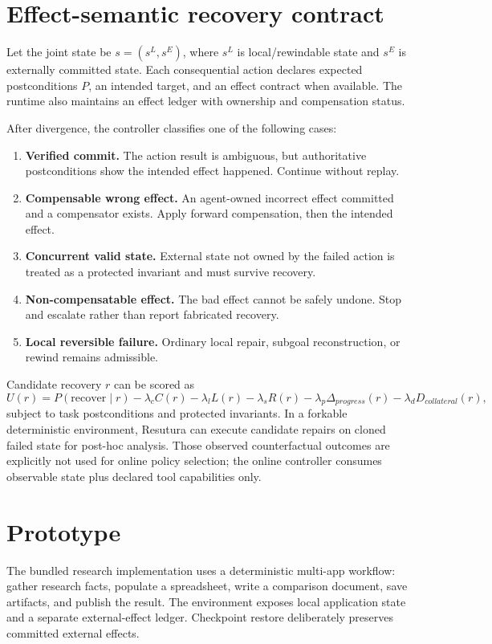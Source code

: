 \documentclass[10pt]{article}
\begin{document}
\section{Effect-semantic recovery contract}
Let the joint state be $s=(s^L,s^E)$, where $s^L$ is local/rewindable state and $s^E$ is externally committed state. Each consequential action declares expected postconditions $P$, an intended target, and an effect contract when available. The runtime also maintains an effect ledger with ownership and compensation status.

After divergence, the controller classifies one of the following cases:

\begin{enumerate}
\item \textbf{Verified commit.} The action result is ambiguous, but authoritative postconditions show the intended effect happened. Continue without replay.
\item \textbf{Compensable wrong effect.} An agent-owned incorrect effect committed and a compensator exists. Apply forward compensation, then the intended effect.
\item \textbf{Concurrent valid state.} External state not owned by the failed action is treated as a protected invariant and must survive recovery.
\item \textbf{Non-compensatable effect.} The bad effect cannot be safely undone. Stop and escalate rather than report fabricated recovery.
\item \textbf{Local reversible failure.} Ordinary local repair, subgoal reconstruction, or rewind remains admissible.
\end{enumerate}

Candidate recovery $r$ can be scored as
\[
U(r)=P(\mathrm{recover}\mid r)-\lambda_c C(r)-\lambda_l L(r)-\lambda_s R(r)-\lambda_p \Delta_{progress}(r)-\lambda_d D_{collateral}(r),
\]
subject to task postconditions and protected invariants. In a forkable deterministic environment, Resutura can execute candidate repairs on cloned failed state for post-hoc analysis. Those observed counterfactual outcomes are explicitly not used for online policy selection; the online controller consumes observable state plus declared tool capabilities only.

\section{Prototype}
The bundled research implementation uses a deterministic multi-app workflow: gather research facts, populate a spreadsheet, write a comparison document, save artifacts, and publish the result. The environment exposes local application state and a separate external-effect ledger. Checkpoint restore deliberately preserves committed external effects.
\end{document}
